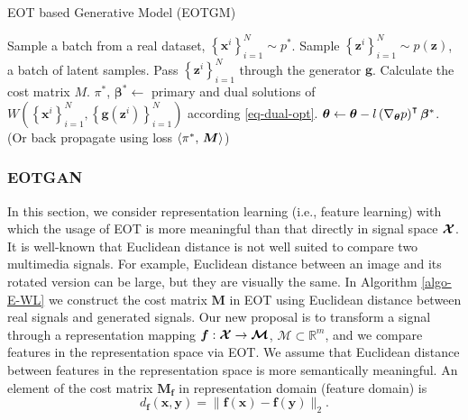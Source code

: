 \begin{algorithm}[!t]
  \caption{EOT based Generative Model (EOTGM)}\label{algo-E-WL}
  \begin{algorithmic}[1]
    \STATE Sample  a batch from a real dataset, $\left\{ \bm{x}^{i} \right\}_{i=1}^{N} \sim p^{\ast}$. 
    \STATE Sample $\left\{ \bm{z}^{i} \right\}_{i=1}^{N} \sim p(\bm{z})$, a batch of latent samples.
    \STATE Pass $\left\{ \bm{z}^{i} \right\}_{i=1}^{N}$ through the generator $\bm{g}$.
    \STATE Calculate the cost matrix $M$.
    \STATE $\pi^{\ast}$, $\bm{\beta}^{\ast} \gets$ primary and dual
    solutions of $W(\left\{ \bm{x}^{i} \right\}_{i=1}^{N}, \left\{
      \bm{g}(\bm{z}^{i})\right\}_{i=1}^{N})$ according \eqref{eq-dual-opt}.
    \STATE $\bm{\theta} \gets \bm{\theta} - l \left(\nabla_{\bm{\theta}}{p}\right)^{\intercal}
    \bm{\beta}^{\ast}$. (Or back propagate using loss $\langle \pi^{\ast},\,\bm{M}\rangle$)
    \ENDWHILE
  \end{algorithmic}
\end{algorithm}

\subsubsection{EOTGAN}

In this section, we consider representation learning (i.e., feature
learning) with which the usage of EOT is more meaningful than that
directly in signal space $\bm{\mathcal{X}}$.
It is well-known that Euclidean distance is not well suited to compare
two multimedia signals. For example, Euclidean distance between an
image and its rotated version can be large, but they are visually the same. In Algorithm \ref{algo-E-WL} we construct the cost matrix $\bm{M}$ in EOT using 
Euclidean distance between real signals and generated signals. Our new proposal is to transform a signal through a representation mapping 
$\bm{f}: \bm{\mathcal{X}} \rightarrow \bm{\mathcal{M}}$, $\bm{\mathcal{M}}\subset\mathbb{R}^{m}$, and we compare features in the representation space via EOT. We assume that Euclidean distance
between features in the representation space is more semantically
meaningful. An element of the cost matrix $\bm{M_f}$ in representation domain (feature domain) is
\begin{equation}\label{def-similarity}
  d_{\bm{f}}(\bm{x}, \bm{y}) = \|\bm{f}(\bm{x})-\bm{f}(\bm{y})\|_{2}.
\end{equation}

